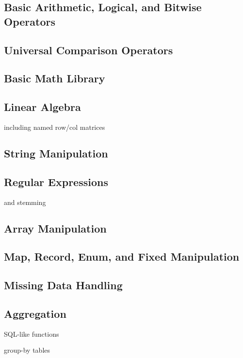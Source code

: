 \documentclass{article}
\begin{document}
\subsection{Basic Arithmetic, Logical, and Bitwise Operators}

\subsection{Universal Comparison Operators}

\subsection{Basic Math Library}

\subsection{Linear Algebra}

including named row/col matrices

\subsection{String Manipulation}

\subsection{Regular Expressions}

and stemming

\subsection{Array Manipulation}

\subsection{Map, Record, Enum, and Fixed Manipulation}

\subsection{Missing Data Handling}

\subsection{Aggregation}

SQL-like functions

group-by tables
\end{document}
